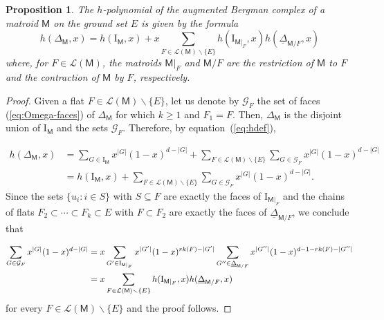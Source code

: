 \documentclass[11pt]{amsart}
\theoremstyle{theorems}
\newtheorem{proposition}[theorem]{Proposition}
\theoremstyle{definition}
\newcommand{\rk}{{\rm rk}}
\newcommand{\gG}{{\mathcal G}}
\newcommand{\lL}{{\mathcal L}}
\newcommand{\M}{{\mathsf{M}}}
\newcommand{\I}{{\mathrm{I}}}
\newcommand{\uDelta}{\underline{\Delta}}
\newcommand{\sm}{{\smallsetminus}}
\begin{document}
\begin{proposition} \label{prop:hOmega}
The $h$-polynomial of the augmented Bergman complex of a matroid $\M$ 
on the ground set $E$ is given by the formula
%
\begin{equation} \label{eq:hOmega}
h(\Delta_{\M}, x) = h(\I_{\M},x) + x
  \sum_{F \in \lL(\M) \sm \{E\}} h(\I_{\M|_F},x) 
	                              h(\uDelta_{\M/F},x)
\end{equation}
% 
where, for $F \in \lL(\M)$, the matroids $\M|_F$ and $\M/F$ are the 
restriction of $\M$ to $F$ and the contraction of $\M$ by $F$, 
respectively.
\end{proposition}

\begin{proof}
Given a flat $F \in \lL(\M) \sm \{E\}$, let us denote by $\gG_F$ the 
set of faces (\ref{eq:Omega-faces}) of $\Delta_{\M}$ for which 
$k \ge 1$ and $F_1 = F$. Then, $\Delta_{\M}$ is the disjoint union 
of $\I_{\M}$ and the sets $\gG_F$. Therefore, by 
equation~(\ref{eq:hdef}),

\begin{align*} 
  h(\Delta_{\M}, x) & = \sum_{G \in \I_{\M}} x^{|G|} 
  (1-x)^{d-|G|} + \sum_{F \in \lL(\M) \sm \{E\}} 
	\sum_{G \in \gG_F} x^{|G|} (1-x)^{d-|G|} 
	\\ & = h(\I_{\M},x) + \sum_{F \in \lL(\M) \sm \{E\}} 
	\sum_{G \in \gG_F} x^{|G|} (1-x)^{d-|G|}. 
\end{align*}
%
Since the sets $\{u_i : i \in S \}$ with $S \subseteq F$ are exactly 
the faces of $\I_{\M|_F}$ and the chains of flats $F_2 \subset \cdots 
\subset F_k \subset E$ with $F \subset F_2$ are exactly the faces of 
$\uDelta_{\M/F}$, we conclude that 

\begin{align*} 
\sum_{G \in \gG_F} x^{|G|} (1-x)^{d-|G|} & = 
x \sum_{G' \in \I_{\M|_F}} x^{|G'|} (1-x)^{\rk(F)-|G'|} 
\sum_{G'' \in \uDelta_{\M/F}} x^{|G''|} 
            (1-x)^{d-1-\rk(F)-|G''|}
\\ & = x \sum_{F \in \lL(\M) \sm \{E\}} 
	       h(\I_{\M|_F},x) h(\uDelta_{\M/F},x)
\end{align*}
%
for every $F \in \lL(\M) \sm \{E\}$ and the proof follows.
\end{proof}
\end{document}

